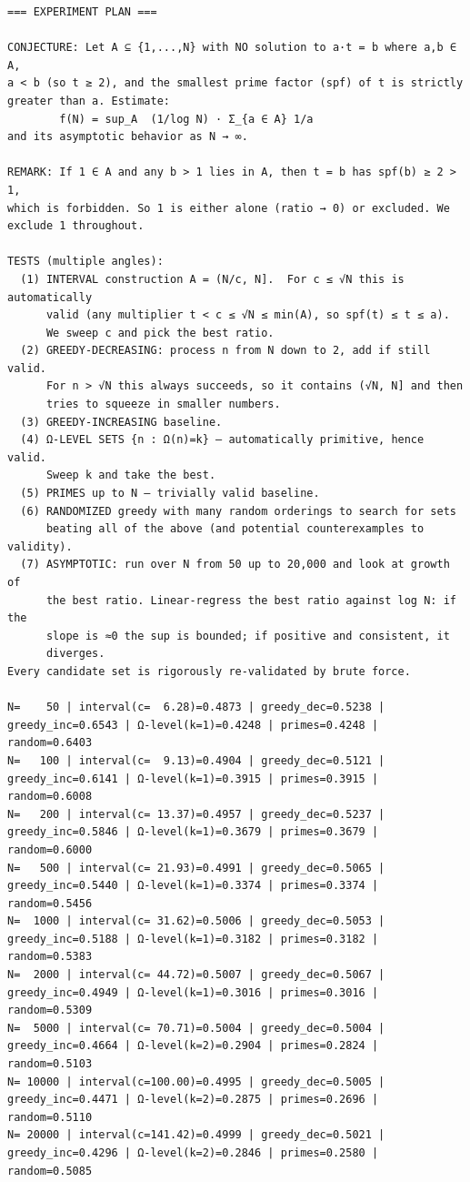 \documentclass[11pt]{article}
\begin{document}
\begin{lstlisting}
=== EXPERIMENT PLAN ===

CONJECTURE: Let A ⊆ {1,...,N} with NO solution to a·t = b where a,b ∈ A,
a < b (so t ≥ 2), and the smallest prime factor (spf) of t is strictly
greater than a. Estimate:
        f(N) = sup_A  (1/log N) · Σ_{a ∈ A} 1/a
and its asymptotic behavior as N → ∞.

REMARK: If 1 ∈ A and any b > 1 lies in A, then t = b has spf(b) ≥ 2 > 1,
which is forbidden. So 1 is either alone (ratio → 0) or excluded. We
exclude 1 throughout.

TESTS (multiple angles):
  (1) INTERVAL construction A = (N/c, N].  For c ≤ √N this is automatically
      valid (any multiplier t < c ≤ √N ≤ min(A), so spf(t) ≤ t ≤ a).
      We sweep c and pick the best ratio.
  (2) GREEDY-DECREASING: process n from N down to 2, add if still valid.
      For n > √N this always succeeds, so it contains (√N, N] and then
      tries to squeeze in smaller numbers.
  (3) GREEDY-INCREASING baseline.
  (4) Ω-LEVEL SETS {n : Ω(n)=k} — automatically primitive, hence valid.
      Sweep k and take the best.
  (5) PRIMES up to N — trivially valid baseline.
  (6) RANDOMIZED greedy with many random orderings to search for sets
      beating all of the above (and potential counterexamples to validity).
  (7) ASYMPTOTIC: run over N from 50 up to 20,000 and look at growth of
      the best ratio. Linear-regress the best ratio against log N: if the
      slope is ≈0 the sup is bounded; if positive and consistent, it
      diverges.
Every candidate set is rigorously re-validated by brute force.

N=    50 | interval(c=  6.28)=0.4873 | greedy_dec=0.5238 | greedy_inc=0.6543 | Ω-level(k=1)=0.4248 | primes=0.4248 | random=0.6403
N=   100 | interval(c=  9.13)=0.4904 | greedy_dec=0.5121 | greedy_inc=0.6141 | Ω-level(k=1)=0.3915 | primes=0.3915 | random=0.6008
N=   200 | interval(c= 13.37)=0.4957 | greedy_dec=0.5237 | greedy_inc=0.5846 | Ω-level(k=1)=0.3679 | primes=0.3679 | random=0.6000
N=   500 | interval(c= 21.93)=0.4991 | greedy_dec=0.5065 | greedy_inc=0.5440 | Ω-level(k=1)=0.3374 | primes=0.3374 | random=0.5456
N=  1000 | interval(c= 31.62)=0.5006 | greedy_dec=0.5053 | greedy_inc=0.5188 | Ω-level(k=1)=0.3182 | primes=0.3182 | random=0.5383
N=  2000 | interval(c= 44.72)=0.5007 | greedy_dec=0.5067 | greedy_inc=0.4949 | Ω-level(k=1)=0.3016 | primes=0.3016 | random=0.5309
N=  5000 | interval(c= 70.71)=0.5004 | greedy_dec=0.5004 | greedy_inc=0.4664 | Ω-level(k=2)=0.2904 | primes=0.2824 | random=0.5103
N= 10000 | interval(c=100.00)=0.4995 | greedy_dec=0.5005 | greedy_inc=0.4471 | Ω-level(k=2)=0.2875 | primes=0.2696 | random=0.5110
N= 20000 | interval(c=141.42)=0.4999 | greedy_dec=0.5021 | greedy_inc=0.4296 | Ω-level(k=2)=0.2846 | primes=0.2580 | random=0.5085


\end{lstlisting}
\end{document}
